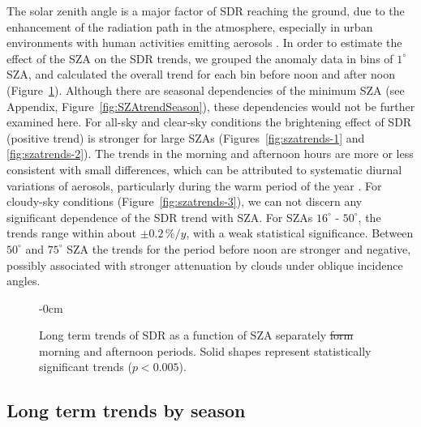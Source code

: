 \documentclass[applsci,article,submit,moreauthors,pdftex]{Definitions/mdpi}
\providecommand{\DIFadd}[1]{{\protect\color{blue}\uwave{#1}}} %
\providecommand{\DIFdel}[1]{{\protect\color{red}\sout{#1}}}                      %
\providecommand{\DIFaddFL}[1]{\DIFadd{#1}} %
\providecommand{\DIFdelFL}[1]{\DIFdel{#1}} %
\providecommand{\DIFaddbeginFL}{} %
\providecommand{\DIFaddendFL}{} %
\providecommand{\DIFdelbeginFL}{} %
\providecommand{\DIFdelendFL}{} %
\begin{document}
The solar zenith angle is a major factor of SDR reaching the ground, due
to the enhancement of the radiation path in the atmosphere, especially
in urban environments with human activities emitting aerosols
\citep{Wang2021}. In order to estimate the effect of the SZA on the SDR
trends, we grouped the anomaly data in bins of \(1^\circ\) SZA, and
calculated the overall trend for each bin before noon and after noon
(Figure~\ref{fig:szatrends}). Although there are seasonal dependencies
of the minimum SZA (see Appendix, Figure~\ref{fig:SZAtrendSeason}),
these dependencies would not be further examined here. For all-sky and
clear-sky conditions the brightening effect of SDR (positive trend) is
stronger for large SZAs (Figures~\ref{fig:szatrends-1} and
\ref{fig:szatrends-2}). The trends in the morning and afternoon hours
are more or less consistent with small differences, which can be
attributed to systematic diurnal variations of aerosols, particularly
during the warm period of the year \citep{Wang2021}. For cloudy-sky
conditions (Figure~\ref{fig:szatrends-3}), we can not discern any
significant dependence of the SDR trend with SZA. For SZAs \(16^\circ\)
- \(50^\circ\), the trends range within about \(\pm 0.2\,\%/y\), with a
weak statistical significance. Between \(50^\circ\) and \(75^\circ\) SZA
the trends for the period before noon are stronger and negative,
possibly associated with stronger attenuation by clouds under oblique
incidence angles.

\begin{figure}[h!]
    \begin{adjustwidth}{-\extralength}{0cm}
        {\centering 
            \hfill
            \hfill
        }
        \caption{Long term trends of SDR as a function of SZA separately \DIFdelbeginFL \DIFdelFL{form }\DIFdelendFL \DIFaddbeginFL \DIFaddFL{from }\DIFaddendFL morning and afternoon periods. Solid shapes  represent statistically significant trends ($p < 0.005$).}\label{fig:szatrends}
    \end{adjustwidth}
\end{figure}

\hypertarget{long-term-trends-by-season}{%
\subsection{Long term trends by
season}\label{long-term-trends-by-season}}
\end{document}
